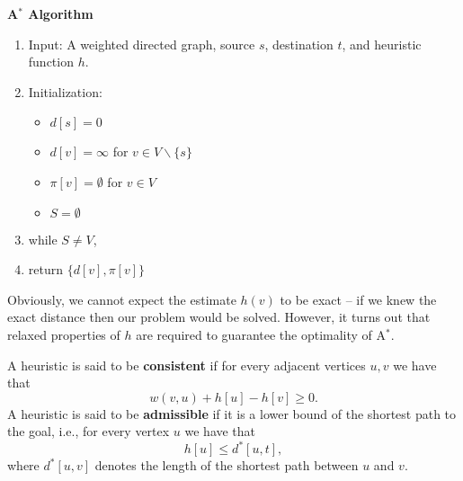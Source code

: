 \begin{algorithm_}\textbf{A$^*$ Algorithm}
\begin{enumerate}
\item{Input:} A weighted directed graph, source $s$, destination $t$, and heuristic function $h$.

\item Initialization:
\begin{itemize}
  \item[] $d[s] = 0$
  \item[] $d[v] = \infty $ for $v \in V\backslash \{ s\} $
  \item[] $\pi [v] = \emptyset $ for $v \in V$
  \item[] $S = \emptyset $
\end{itemize}

\item while $S \ne V$,





\item return $\{ d[v],\pi [v]\} $
\end{enumerate}
\end{algorithm_}

Obviously, we cannot expect the estimate $h(v)$ to be exact -- if we knew the exact distance then our problem would be solved. However, it turns out that relaxed properties of $h$ are required to guarantee the optimality of A$^*$. 

\begin{definition}
A heuristic is said to be \textbf{consistent} if for every adjacent vertices $u,v$ we have that $$w(v,u)+h[u]-h[v] \geq 0.$$
A heuristic is said to be \textbf{admissible} if it is a lower bound of the shortest path to the goal, i.e., for every vertex $u$ we have that $$h[u] \leq d^*[u,t],$$
where $d^*[u,v]$ denotes the length of the shortest path between $u$ and $v$.
\end{definition}

